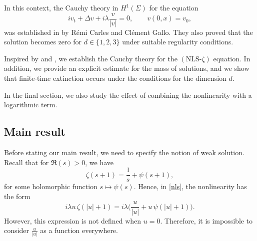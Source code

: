 \documentclass[10pt]{article}
\begin{document}
In this context, the Cauchy theory in $H^{1}(\Sigma)$ for the equation
\begin{equation}\tag{E0}\label{E0}
i v_t + \Delta v + i\lambda \frac{v}{|v|} = 0, 
\qquad v(0,x) = v_0,
\end{equation}
was established in \cite{3} by R\'emi Carles and Cl\'ement Gallo. They also proved that the solution becomes zero for $d \in \{1,2,3\}$ under suitable regularity conditions.

Inspired by \cite{3} and \cite{1}, we establish the Cauchy theory for the $(\text{NLS-}\zeta)$ equation. In addition, we provide an explicit estimate for the mass of solutions, and we show that finite-time extinction occurs under the conditions for the dimension $d$.


In the final section, we also study the effect of combining the nonlinearity with a logarithmic term.

\subsection{Main result}
Before stating our main result, we need to specify the notion of weak solution. Recall that for $\Re(s) > 0$, we have
\[
\zeta(s+1) = \frac{1}{s} + \psi(s+1),
\]
for some holomorphic function $s \mapsto \psi(s)$. Hence, in \eqref{nls}, the nonlinearity has the form
\[
i \lambda u \, \zeta(|u| + 1) = i\lambda\big(\frac{u}{|u|} + u \, \psi(|u| + 1)\big).
\]
However, this expression is not defined when $u = 0$. Therefore, it is impossible to consider $\frac{u}{|u|}$ as a function everywhere.
\end{document}

